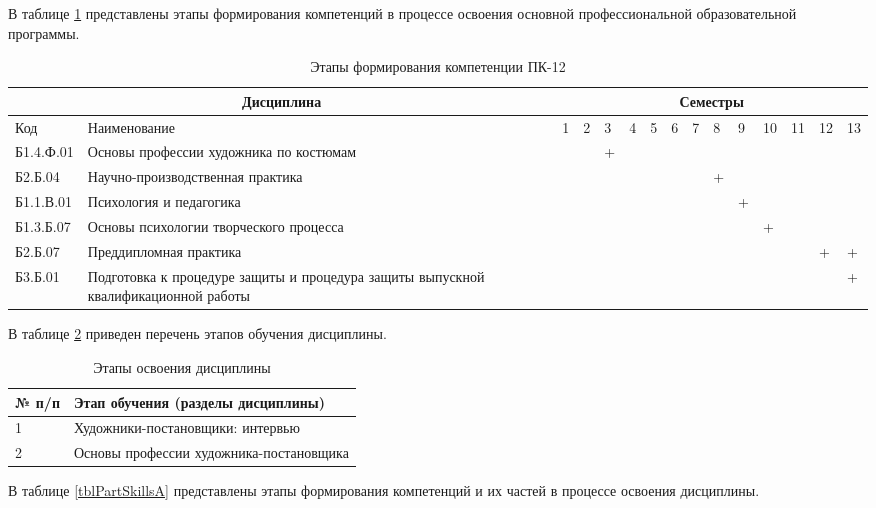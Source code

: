 В таблице \ref{tblCompetention1} представлены этапы формирования компетенций в процессе освоения основной профессиональной образовательной программы.

\begin{table} [ht]%
	\caption{Этапы формирования компетенции ПК-12}
	\label{tblCompetention1}	
	\begin{tabularx}{\textwidth}{p{}p{}|X|X|X|X|X|X|X|X|X|X|X|X|X}
        \toprule
        \multicolumn{2}{c}{\textbf{Дисциплина}}&\multicolumn{13}{c}{\textbf{Семестры}}\\
        \midrule        
    	Код & Наименование &1&2&3&4&5&6&7&8&9&10&11&12&13\\
        \midrule 
        Б1.4.Ф.01 & Основы профессии художника по костюмам & & &+& & & & & & & & & & \\        
        \midrule         
  		Б2.Б.04 & Научно-производственная практика & & & & & & & &+& & & & & \\        
        \midrule   		
  		Б1.1.В.01 & Психология и педагогика & & & & & & & & &+& & & & \\ 
        \midrule   		
  		Б1.3.Б.07 & Основы психологии творческого процесса & & & & & & & & & &+& & & \\
        \midrule   		
  		Б2.Б.07	& Преддипломная практика & & & & & & & & & & & &+&+\\
        \midrule   		
  		Б3.Б.01	& Подготовка к процедуре защиты и процедура защиты выпускной квалификационной работы & & & & & & & & & & & & &+\\
        \bottomrule
	\end{tabularx}
\end{table}

В таблице \ref{tblPartsA} приведен перечень этапов обучения дисциплины. 

\begin{table} [ht]%
	\caption{Этапы освоения дисциплины}
	\label{tblPartsA}	
	\begin{tabularx}{\textwidth}{p{}X}
        \toprule
    	\textbf{№ п/п} & \textbf{Этап обучения (разделы дисциплины)}\\
        \midrule 
		1 & Художники-постановщики: интервью \\
		2 & Основы профессии художника-постановщика \\
        \bottomrule
	\end{tabularx}
\end{table}

В таблице \ref{tblPartSkillsA} представлены этапы формирования компетенций и их частей в процессе освоения дисциплины. 

